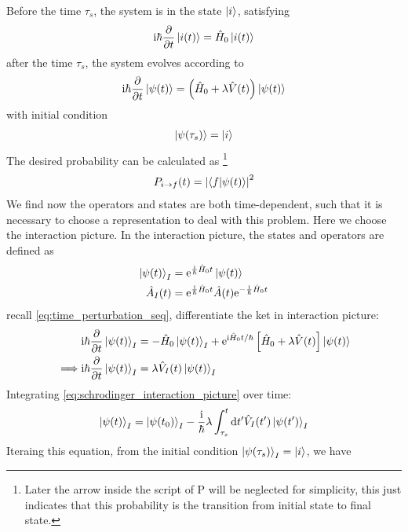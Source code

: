 Before the time $\tau_s$, the system is in the state $\ket{i}$, satisfying 
\begin{align}
    \mathrm{i} \hbar \frac{\partial }{\partial t} \ket{i(t)} = \hat{H}_0 \ket{i(t)}
\end{align}
after the time $\tau_s$, the system evolves according to
\begin{align}
    \mathrm{i} \hbar \frac{\partial }{\partial t} \ket{\psi(t)} = \left(\hat{H}_0 + \lambda \hat{V}(t)\right) \ket{\psi(t)} \label{eq:time_perturbation_seq}
\end{align}
with initial condition 
\begin{align}
    \ket{\psi(\tau_s)} = \ket{i}
\end{align}
The desired probability can be calculated as \footnote{Later the arrow inside the script of P will be neglected for simplicity, this just indicates that this probability is the transition from initial state to final state.}
\begin{align}
    P_{i \to f} (t) = \left| \braket{f|\psi(t)} \right|^2
\end{align}
We find now the operators and states are both time-dependent, such that it is necessary to choose a representation to deal with this problem. Here we choose the interaction picture. In the interaction picture, the states and operators are defined as
\begin{align}
    \ket{\psi(t)}_I &= \mathrm{e}^{\frac{\mathrm{i}}{\hbar} \hat{H}_0 t} \ket{\psi(t)} \\
    \hat{A}_I (t) &= \mathrm{e}^{\frac{\mathrm{i}}{\hbar} \hat{H}_0 t} \hat{A}(t) \mathrm{e}^{-\frac{\mathrm{i}}{\hbar} \hat{H}_0 t}
\end{align}
recall \cref{eq:time_perturbation_seq}, differentiate the ket in interaction picture: 
\begin{align}
    &\mathrm{i} \hbar \frac{\partial }{\partial t} \ket{\psi(t)}_I = - \hat{H}_0 \ket{\psi(t)}_I + \mathrm{e}^{\mathrm{i} \hat{H}_0 t/\hbar} \left[\hat{H}_0 + \lambda \hat{V}(t)\right] \ket{\psi(t)} \\
    \implies & \mathrm{i} \hbar \frac{\partial }{\partial t} \ket{\psi(t)}_I = \lambda \hat{V}_I(t) \ket{\psi(t)}_I \label{eq:schrodinger_interaction_picture}
\end{align}
Integrating \cref{eq:schrodinger_interaction_picture} over time: 
\begin{align}
    \ket{\psi(t)}_I = \ket{\psi(t_0)}_I - \frac{\mathrm{i}}{\hbar}\lambda \int_{\tau_s}^{t} \mathrm{d} t' \hat{V}_I(t') \ket{\psi(t')}_I
\end{align}
Iteraing this equation, from the initial condition $\ket{\psi(\tau_s)}_I = \ket{i}$, we have 
